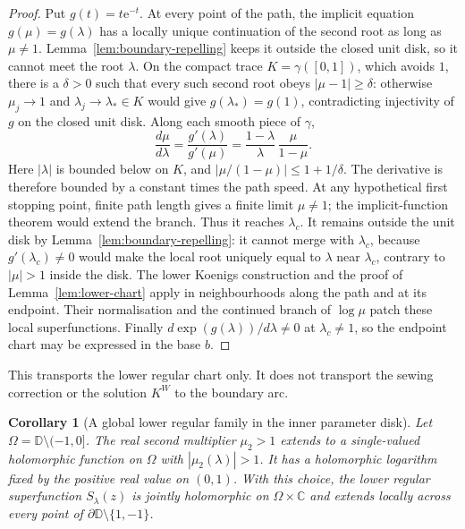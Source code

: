 \documentclass[11pt,a4paper]{article}
\newtheorem{corollary}[theorem]{Corollary}
\theoremstyle{definition}
\newcommand{\Kk}{K}
\newcommand{\eee}{\mathrm{e}}
\begin{document}
\begin{proof}
Put $g(t)=t\eee^{-t}$.  At every point of the path, the implicit
equation $g(\mu)=g(\lambda)$ has a locally unique continuation of the
second root as long as $\mu\ne1$.  Lemma~\ref{lem:boundary-repelling}
keeps it outside the closed unit disk, so it cannot meet the root
$\lambda$.  On the compact trace $K=\gamma([0,1])$, which avoids $1$,
there is a $\delta>0$ such that every such second root obeys
$|\mu-1|\ge\delta$: otherwise $\mu_j\to1$ and
$\lambda_j\to\lambda_*\in K$ would give $g(\lambda_*)=g(1)$,
contradicting injectivity of $g$ on the closed unit disk.
Along each smooth piece of $\gamma$,
\[
 \frac{d\mu}{d\lambda}
 =\frac{g'(\lambda)}{g'(\mu)}
 =\frac{1-\lambda}{\lambda}\,\frac{\mu}{1-\mu}.
\]
Here $|\lambda|$ is bounded below on $K$, and
$|\mu/(1-\mu)|\le1+1/\delta$.  The derivative is therefore bounded
by a constant times the path speed.  At any hypothetical first stopping
point, finite path length gives a finite limit $\mu\ne1$; the
implicit-function theorem would extend the branch.  Thus it reaches
$\lambda_c$.  It remains outside the unit disk by
Lemma~\ref{lem:boundary-repelling}: it cannot merge with $\lambda_c$,
because $g'(\lambda_c)\ne0$ would make the local root uniquely equal to
$\lambda$ near $\lambda_c$, contrary to $|\mu|>1$ inside the disk.
The lower Koenigs construction and
the proof of Lemma~\ref{lem:lower-chart} apply in neighbourhoods along
the path and at its endpoint.  Their normalisation and the continued
branch of $\log\mu$ patch these local superfunctions.  Finally
$d\exp(g(\lambda))/d\lambda\ne0$ at $\lambda_c\ne1$, so the endpoint
chart may be expressed in the base $b$.
\end{proof}

This transports the lower regular chart only.  It does not transport
the sewing correction or the solution $\Kk^W$ to the boundary arc.

\begin{corollary}[A global lower regular family in the inner parameter disk]
\label{cor:global-lower}
Let $\Omega=\mathbb D\setminus(-1,0]$.  The real second multiplier
$\mu_2>1$ extends to a single-valued holomorphic function on $\Omega$
with $|\mu_2(\lambda)|>1$.  It has a holomorphic logarithm fixed by the
positive real value on $(0,1)$.  With this choice, the lower regular
superfunction $S_\lambda(z)$ is jointly holomorphic on
$\Omega\times\mathbb C$ and extends locally across every point of
$\partial\mathbb D\setminus\{1,-1\}$.
\end{corollary}
\end{document}
